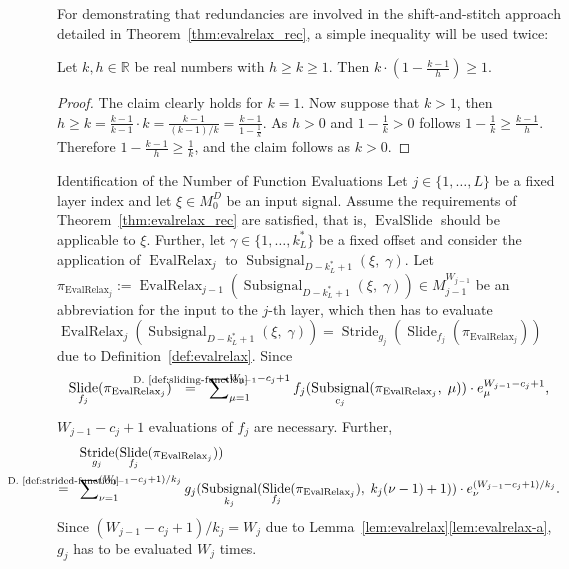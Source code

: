 \documentclass[journal]{IEEEtran}
\makeatletter
\def\subsubsection{\@startsection{subsubsection} {3} {\z@} {1.5ex plus 1.5ex minus 0.5ex} {0.7ex plus .5ex minus 0ex} {\normalfont\normalsize\itshape}}
\newcommand{\R}{\mathbb{R}}
\newcommand{\discint}[2]{\{#1,\dotsc,#2\}}
\newcommand{\inint}[2]{\in\discint{#1}{#2}}
\DeclareMathOperator{\Subsignal}{Subsignal}
\DeclareMathOperator{\Slide}{Slide}
\DeclareMathOperator{\Stride}{Stride}
\DeclareMathOperator{\EvalSlide}{EvalSlide}
\newcommand{\equsing}[1]{\overset{\mathclap{\text{#1}}}{=}}
\DeclareMathOperator{\EvalRelax}{EvalRelax}
\makeatother
\begin{document}
For demonstrating that redundancies are involved in the shift-and-stitch approach detailed in Theorem~\ref{thm:evalrelax_rec}, a simple inequality will be used twice:
\begin{remark}
\label{rem:evalrelax-comp-ineq}
Let $k,h\in\R$ be real numbers with $h \geq k \geq 1$.
Then $k\cdot\left(1 - \frac{k - 1}{h}\right) \geq 1$.
\end{remark}\begin{proof}
The claim clearly holds for $k = 1$.
Now suppose that $k > 1$, then $h \geq k = \frac{k - 1}{k - 1}\cdot k = \frac{k - 1}{(k - 1) / k} = \frac{k - 1}{1 - \frac{1}{k}}$.
As $h > 0$ and $1 - \frac{1}{k} > 0$ follows $1 - \frac{1}{k} \geq \frac{k - 1}{h}$.
Therefore $1 - \frac{k - 1}{h} \geq \frac{1}{k}$, and the claim follows as $k > 0$.
\end{proof}\subsubsection{Identification of the Number of Function Evaluations}
Let $j\inint{1}{L}$ be a fixed layer index and let $\xi\in M_0^D$ be an input signal.
Assume the requirements of Theorem~\ref{thm:evalrelax_rec} are satisfied, that is, $\EvalSlide$ should be applicable to $\xi$.
Further, let $\gamma\inint{1}{k_L^*}$ be a fixed offset and consider the application of $\EvalRelax_j$ to $\Subsignal_{D - k_L^* + 1}(\xi,\;\gamma)$.
Let $\pi_{\EvalRelax_j} := \EvalRelax_{j - 1}(\Subsignal_{D - k_L^* + 1}(\xi,\;\gamma))\in M_{j - 1}^{W_{j - 1}}$ be an abbreviation for the input to the $j$-th layer, which then has to evaluate $\EvalRelax_j(\Subsignal_{D - k_L^* + 1}(\xi,\;\gamma)) = \Stride_{g_j}(\Slide_{f_j}(\pi_{\EvalRelax_j}))$ due to Definition~\ref{def:evalrelax}.
Since
\begin{displaymath}
  \Slide_{f_j}(\pi_{\EvalRelax_j})
  \ \ \equsing{D.~\ref{def:sliding-function}}\ \ \sum\nolimits_{\mu = 1}^{W_{j - 1} - c_j + 1} f_j(\Subsignal_{c_j}(\pi_{\EvalRelax_j},\;\mu))\cdot e_\mu^{W_{j - 1} - c_j + 1}\text{,}
\end{displaymath}$W_{j - 1} - c_j + 1$ evaluations of $f_j$ are necessary.
Further,
\begin{align*}
  & \Stride_{g_j}(\Slide_{f_j}(\pi_{\EvalRelax_j}))\\
  \equsing{D.~\ref{def:strided-function}}\ \ & \sum\nolimits_{\nu = 1}^{(W_{j - 1} - c_j + 1) / k_j} g_j(\Subsignal_{k_j}(\Slide_{f_j}(\pi_{\EvalRelax_j}),\;k_j(\nu - 1) + 1))\cdot e_\nu^{(W_{j - 1} - c_j + 1) / k_j}\text{.}
\end{align*}
Since $(W_{j - 1} - c_j + 1) / k_j = W_j$ due to Lemma~\ref{lem:evalrelax}\ref{lem:evalrelax-a}, $g_j$ has to be evaluated $W_j$ times.
\end{document}
